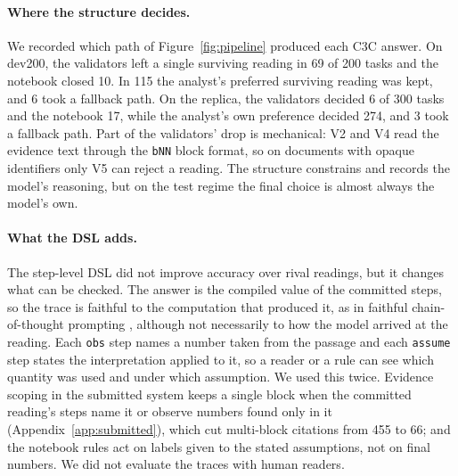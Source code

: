\documentclass[11pt]{article}%
\begin{document}
\paragraph{Where the structure decides.} We recorded which path of
Figure~\ref{fig:pipeline} produced each \textsc{C3C} answer. On dev200, the
validators left a single surviving reading in 69 of 200 tasks and the
notebook closed 10. In 115 the analyst's preferred surviving reading was kept,
and 6 took a fallback path. On the replica, the validators decided 6 of 300
tasks and the notebook 17, while the analyst's own preference decided 274,
and 3 took a fallback path. Part of the validators' drop is mechanical:
\textsc{V2} and \textsc{V4} read the evidence text through the \texttt{bNN}
block format, so on documents with opaque identifiers only \textsc{V5} can
reject a reading.
The structure constrains and records the model's reasoning, but on the test
regime the final choice is almost always the model's own.

\paragraph{What the DSL adds.} The step-level DSL did not improve accuracy
over rival readings, but it changes what can be checked. The answer is the
compiled value of the committed steps, so the trace is faithful to the
computation that produced it, as in faithful chain-of-thought prompting
\citep{lyu2023faithful}, although not necessarily to how the model arrived at
the reading. Each \texttt{obs} step names a number taken from the passage and
each \texttt{assume} step states the interpretation applied to it, so a reader
or a rule can see which quantity was used and under which assumption. We used
this twice. Evidence scoping in the submitted system keeps a single block when
the committed reading's steps name it or observe numbers found only in it
(Appendix~\ref{app:submitted}), which cut multi-block citations from 455 to 66;
and the notebook rules act on labels given to the stated assumptions, not on
final numbers. We did not evaluate the traces with human readers.
\end{document}
